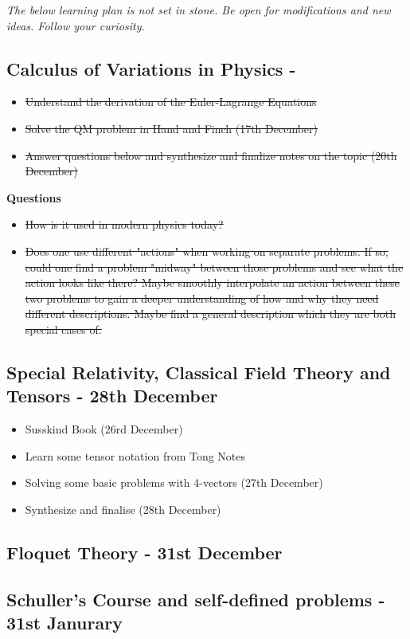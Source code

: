 \textit{The below learning plan is not set in stone. Be open for modifications and new ideas. Follow your curiosity.}
\subsection*{Calculus of Variations in Physics - }   
\begin{itemize}
    \item \sout{Understand the derivation of the Euler-Lagrange Equations}
    \item \sout{Solve the QM problem in Hand and Finch (17th December)}
    \item \sout{Answer questions below and synthesize and finalize notes on the topic (20th December)}
\end{itemize}
\textbf{Questions}
\begin{itemize}
    \item \sout{How is it used in modern physics today?}
    \item \sout{Does one use different "actions" when working on separate problems. If so, could one find a problem "midway" between those problems and see what the action looks like there? Maybe smoothly interpolate an action between these two problems to gain a deeper understanding of how and why they need different descriptions. Maybe find a general description which they are both special cases of.}
\end{itemize} 
\subsection*{Special Relativity, Classical Field Theory and Tensors - 28th December}
\begin{itemize}
    \item Susskind Book (26rd December)
    \item Learn some tensor notation from Tong Notes
    \item Solving some basic problems with 4-vectors (27th December)
    \item Synthesize and finalise (28th December)
\end{itemize}
\subsection*{Floquet Theory - 31st December}
\subsection*{Schuller's Course and self-defined problems - 31st Janurary}
